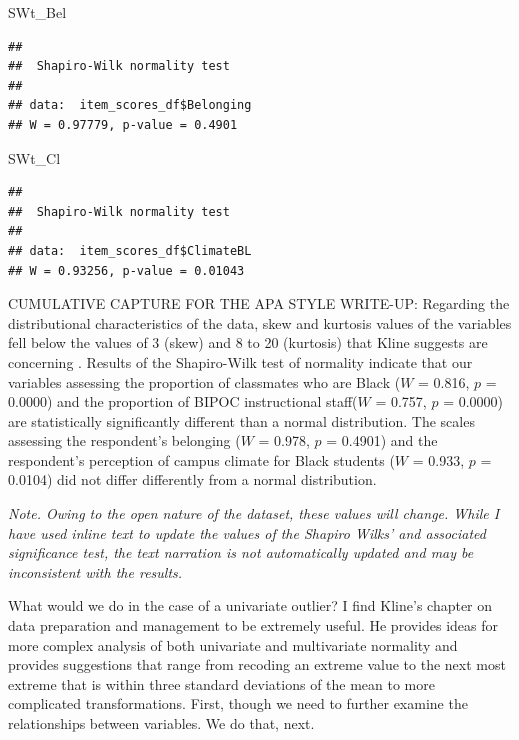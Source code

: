 \documentclass[
]{book}
\newenvironment{Shaded}{\begin{snugshade}}{\end{snugshade}}
\newcommand{\NormalTok}[1]{#1}
\begin{document}
\begin{Shaded}
\begin{Highlighting}[]
\NormalTok{SWt\_Bel}
\end{Highlighting}
\end{Shaded}

\begin{verbatim}
## 
##  Shapiro-Wilk normality test
## 
## data:  item_scores_df$Belonging
## W = 0.97779, p-value = 0.4901
\end{verbatim}

\begin{Shaded}
\begin{Highlighting}[]
\NormalTok{SWt\_Cl}
\end{Highlighting}
\end{Shaded}

\begin{verbatim}
## 
##  Shapiro-Wilk normality test
## 
## data:  item_scores_df$ClimateBL
## W = 0.93256, p-value = 0.01043
\end{verbatim}

CUMULATIVE CAPTURE FOR THE APA STYLE WRITE-UP: Regarding the distributional characteristics of the data, skew and kurtosis values of the variables fell below the values of 3 (skew) and 8 to 20 (kurtosis) that Kline suggests are concerning \citeyearpar{kline_principles_2016}. Results of the Shapiro-Wilk test of normality indicate that our variables assessing the proportion of classmates who are Black (\(W\) = 0.816, \(p\) = 0.0000) and the proportion of BIPOC instructional staff(\(W\) = 0.757, \(p\) = 0.0000) are statistically significantly different than a normal distribution. The scales assessing the respondent's belonging (\(W\) = 0.978, \(p\) = 0.4901) and the respondent's perception of campus climate for Black students (\(W\) = 0.933, \(p\) = 0.0104) did not differ differently from a normal distribution.

\emph{Note. Owing to the open nature of the dataset, these values will change. While I have used inline text to update the values of the Shapiro Wilks' and associated significance test, the text narration is not automatically updated and may be inconsistent with the results.}

What would we do in the case of a univariate outlier? I find Kline's \citeyearpar{kline_principles_2016} chapter on data preparation and management to be extremely useful. He provides ideas for more complex analysis of both univariate and multivariate normality and provides suggestions that range from recoding an extreme value to the next most extreme that is within three standard deviations of the mean to more complicated transformations. First, though we need to further examine the relationships between variables. We do that, next.
\end{document}
